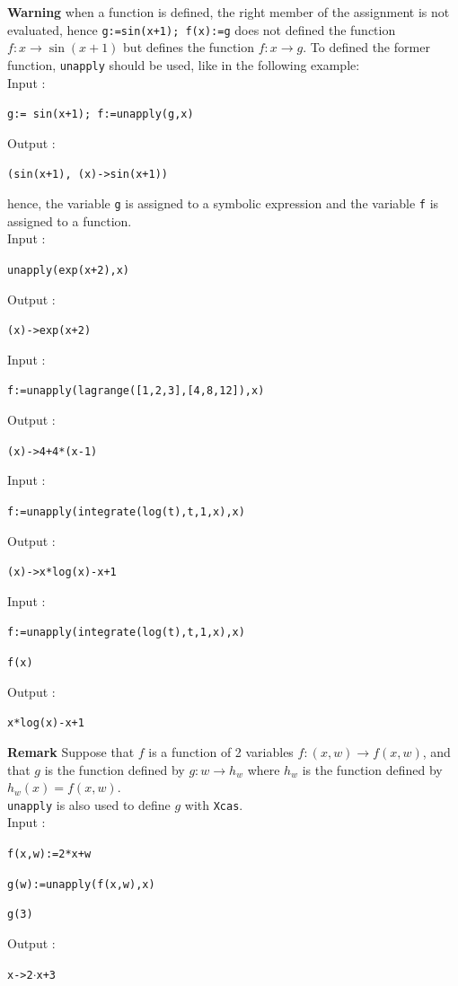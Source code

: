 \documentclass[a4paper,11pt]{book}
\begin{document}
{\bf Warning} when a function is defined,
the right member of the assignment is not evaluated,
hence \verb|g:=sin(x+1); f(x):=g| does not defined the function 
$f: x \rightarrow \sin(x+1)$ but defines the function
$f: x \rightarrow g$. To defined the former function, {\tt unapply}
should be used, like in the following example:\\
Input :
\begin{center}{\tt g:= sin(x+1); f:=unapply(g,x)}\end{center}
Output :
\begin{center}{\tt (sin(x+1), (x)->sin(x+1))}\end{center} 
hence, the variable {\tt g} is assigned to a symbolic expression
and the variable {\tt f} is assigned to a function.\\
Input :
\begin{center}{\tt unapply(exp(x+2),x)}\end{center}
Output :
\begin{center}{\tt (x)->exp(x+2)}\end{center} 
Input :
\begin{center}{\tt f:=unapply(lagrange([1,2,3],[4,8,12]),x)}\end{center}
Output :
\begin{center}{\tt (x)->4+4*(x-1)}\end{center} 
Input :
\begin{center}{\tt f:=unapply(integrate(log(t),t,1,x),x)}\end{center}
Output :
\begin{center}{\tt  (x)->x*log(x)-x+1}\end{center} 
Input :
\begin{center}{\tt f:=unapply(integrate(log(t),t,1,x),x)}\end{center}
\begin{center}{\tt f(x)}\end{center}
Output :
\begin{center}{\tt  x*log(x)-x+1}\end{center}
{\bf Remark}
Suppose that $f$ is a function of 2 variables $f:(x,w)\rightarrow f(x,w)$, 
and that $g$ is the function defined by
$g: w \rightarrow h_w$ where $h_w$ is the function defined by 
$h_w(x)=f(x,w)$.\\ 
{\tt unapply} is  also used to define $g$ with {\tt Xcas}.\\
Input : 
\begin{center}{\tt f(x,w):=2*x+w}\end{center}
\begin{center}{\tt g(w):=unapply(f(x,w),x)}\end{center}
\begin{center}{\tt g(3)}\end{center}
Output :
\begin{center}{\tt  x->2$\cdot$x+3}\end{center} 
\end{document}
